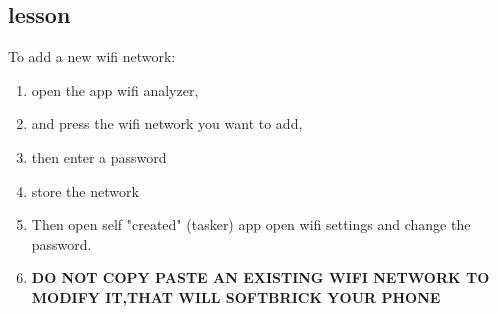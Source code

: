\subsection{lesson}
To add a new wifi network:
\begin{enumerate}
    \item open the app wifi analyzer, 
    \item and press the wifi network you want to add, 
    \item then enter a password
    \item store the network
    \item Then open self "created" (tasker) app open wifi settings and change the password.
    \item \textbf{DO NOT COPY PASTE AN EXISTING WIFI NETWORK TO MODIFY IT,THAT WILL SOFTBRICK YOUR PHONE}
\end{enumerate}